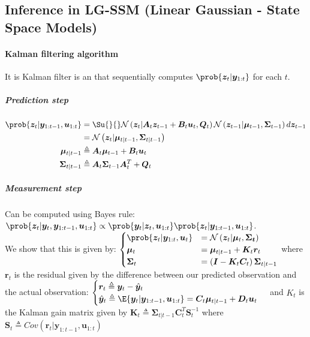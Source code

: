 \subsection{Inference in LG-SSM (Linear Gaussian - State Space Models)}
\paragraph{Kalman filtering algorithm}
It is Kalman filter is an  that sequentially computes $\prob{\bm{z}_{t}|\bm{y}_{1:t}}$
for each $t$.

\subparagraph{Prediction step}
\begin{align*}
    \prob{\bm{z}_{t}|\bm{y}_{1:t-1},\bm{u}_{1:t}} &= \Su{}{}\mathcal{N}\left(\bm{z}_{t}|\bm{A}_{t}
    \bm{z}_{t-1}+\bm{B}_{t}\bm{u}_{t},\bm{Q}_{t}\right)\mathcal{N}\left(\bm{z}_{t-1}|\bm{\mu}_{t-1},
\bm{\Sigma}_{t-1}\right)d\bm{z}_{t-1}\\
                                                  &= \mathcal{N}\left(\bm{z}_{t}|\bm{\mu}_{t|t-1}
                                                  ,\bm{\Sigma}_{t|t-1}\right)\\
        \bm{\mu}_{t|t-1} &\triangleq \bm{A}_{t}\bm{\mu}_{t-1} + \bm{B}_{t}\bm{u}_{t}\\
        \bm{\Sigma}_{t|t-1} &\triangleq \bm{A}_{t}\bm{\Sigma}_{t-1}\bm{A}_{t}^{T} + \bm{Q}_{t}\\
\end{align*}

\subparagraph{Measurement step}
Can be computed using Bayes rule:\\
$\prob{\bm{z}_{t}|\bm{y}_{t},\bm{y}_{1:t-1},\bm{u}_{1:t}}\propto\prob{\bm{y}_{t}|\bm{z}_{t},\bm{u}_{
1:t}}\prob{\bm{z}_{t}|\bm{y}_{1:t-1},\bm{u}_{1:t}}$.\\
We show that this is given by:
$\begin{cases}
    \prob{\bm{z}_{t}|\bm{y}_{1:t},\bm{u}_{t}}  &= \mathcal{N}\left(\bm{z}_{t}|\bm{\mu}_{t},\bm{\Sigma
    _{t}}\right)\\
            \bm{\mu}_{t} &= \bm{\mu}_{t|t-1} + \bm{K}_{t}\bm{r}_{t}\\
            \bm{\Sigma}_{t} &= \left(\bm{I}-\bm{K}_{t}\bm{C}_{t}\right)\bm{\Sigma}_{t|t-1}
\end{cases}$
where $\bm{r}_{t}$ is the residual given by the difference between our predicted observation and the 
actual observation:
$\begin{cases}
    \bm{r}_{t}\triangleq \bm{y}_{t} - \hat{\bm{y}}_{t} \\
    \hat{\bm{y}}_{t} \triangleq \E{\bm{y}_{t}|\bm{y}_{1:t-1},\bm{u}_{1:t}} = \bm{C}_{t}\bm{\mu}_{
    t|t-1} + \bm{D}_{t}\bm{u}_{t}
\end{cases}$
and $K_{t}$ is the Kalman gain matrix given by $\bm{K}_{t}\triangleq \bm{\Sigma}_{t|t-1}\bm{C}^{T}_{
t}\bm{S}^{-1}_{t}$
where $\bm{S}_{t}\triangleq Cov(\bm{r}_{t}|\bm{y}_{1:t-1},\bm{u}_{1:t})$

